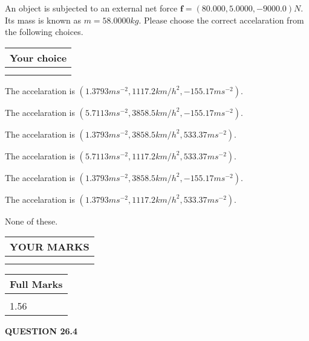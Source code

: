 \documentclass[12pt]{article}
\begin{document}
  
 
An object is subjected to an external net force $\mathbf{f}=(
80.000 ,
5.0000,
-9000.0  )N$. Its mass is known as
$m= %
58.0000  kg$. Please choose the correct accelaration
from the following choices.
 
  
  
\noindent\hspace{3.0in} \begin{tabular}{|l|}
\hline
Your choice \\
\hline
 \\ 
 \\ 
\hline
\end{tabular}
  
  
 
 
The accelaration is
$(
1.3793ms^{-2},
1117.2km/h^2,
-155.17ms^{-2}
).
$
 
 
The accelaration is
$(
5.7113ms^{-2},
3858.5km/h^2,
-155.17ms^{-2}
).
$
 
 
The accelaration is
$(
1.3793ms^{-2},
3858.5km/h^2,
533.37ms^{-2}
).
$
 
 
The accelaration is
$(
5.7113ms^{-2},
1117.2km/h^2,
533.37ms^{-2}
).
$
 
 
The accelaration is
$(
1.3793ms^{-2},
3858.5km/h^2,
-155.17ms^{-2}
).
$
 
 
The accelaration is
$(
1.3793ms^{-2},
1117.2km/h^2,
533.37ms^{-2}
).
$
 
 
 None of these.
 
 
 
 

 
\vspace{0.3in}
  
\vspace{0.2in}
  
\noindent\begin{tabular}{|l|}
\hline
 YOUR MARKS  \\
\hline
 \\ 
 \\ 
\hline
\end{tabular}
\hspace{0.05in} \begin{tabular}{|l|}
\hline
 Full Marks  \\
\hline
 \\ 
1.56 \\
\hline
\end{tabular}
{\textbf{\Large{QUESTION
26.4 
}}}
  
\end{document}
